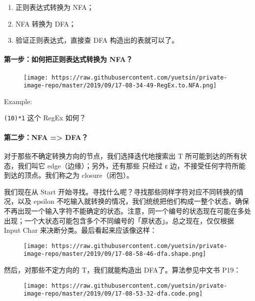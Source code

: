 \documentclass[
]{article}
\begin{document}
\begin{enumerate}
\def\labelenumi{\arabic{enumi}.}
\item
  正则表达式转换为 NFA；
\item
  NFA 转换为 DFA；
\item
  验证正则表达式，直接查 DFA 构造出的表就可以了。
\end{enumerate}

\hypertarget{header-n50}{%
\paragraph{第一步：如何把正则表达式转换为 NFA？}\label{header-n50}}

\begin{figure}
\centering
\texttt{[image: https://raw.githubusercontent.com/yuetsin/private-image-repo/master/2019/09/17-08-34-49-RegEx.to.NFA.png]}
\caption{}
\end{figure}

Example:

\texttt{(1\textbar{}0)*1} 这个 RegEx 如何？

\hypertarget{header-n55}{%
\paragraph{第二步：NFA =\textgreater{} DFA？}\label{header-n55}}

对于那些不确定转换方向的节点，我们选择迭代地搜索出 T
所可能到达的所有状态，我们叫它 edge（边缘）；另外，还有那些 只经过 ε
边，不接受任何字符所能到达的顶点。我们称之为 closure（闭包）。

我们现在从 Start
开始寻找。寻找什么呢？寻找那些同样字符对应不同转换的情况，以及 epsilon
不吃输入就转换的情况，我们统统把他们构成一整个状态，确保不再出现一个输入字符不能确定的状态。注意，同一个编号的状态现在可能在多处出现；一个大状态可能包含多个不同编号的「原状态」。总之现在，仅仅根据
Input Char 来决断分类。最后看起来应该像这样：

\begin{figure}
\centering
\texttt{[image: https://raw.githubusercontent.com/yuetsin/private-image-repo/master/2019/09/17-08-58-46-dfa.shape.png]}
\caption{}
\end{figure}

然后，对那些不定方向的 T，我们就能构造出 DFA了。算法参见中文书 P19：

\begin{figure}
\centering
\texttt{[image: https://raw.githubusercontent.com/yuetsin/private-image-repo/master/2019/09/17-08-53-32-dfa.code.png]}
\caption{}
\end{figure}
\end{document}

